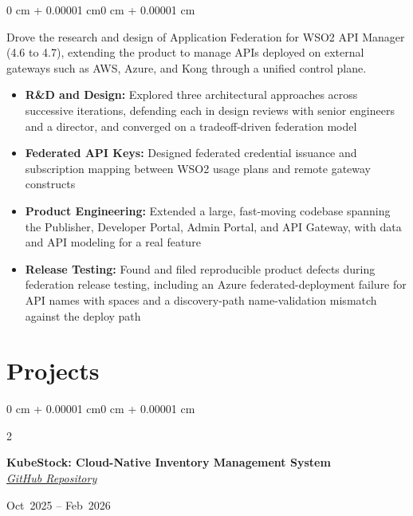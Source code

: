 \documentclass[10pt, letterpaper]{article}
\let\oldhref\href
\renewcommand{\href}[2]{\oldhref{#1}{\textit{\underline{#2}}}}
\newenvironment{highlights}{
    \begin{itemize}[
        topsep=0.10 cm,
        parsep=0.10 cm,
        partopsep=0pt,
        itemsep=0pt,
        leftmargin=0 cm + 10pt
    ]
}{
    \end{itemize}
}
\newenvironment{onecolentry}{
    \begin{adjustwidth}{0 cm + 0.00001 cm}{0 cm + 0.00001 cm}
}{
    \end{adjustwidth}
}
\newenvironment{twocolentry}[2][]{
    \onecolentry
    \def\secondColumn{#2}
    \setcolumnwidth{\fill, 4.5 cm}
    \begin{paracol}{2}
}{
    \switchcolumn \raggedleft \secondColumn
    \end{paracol}
    \endonecolentry
}
\begin{document}
    \begin{onecolentry}
        Drove the research and design of Application Federation for WSO2 API Manager (4.6 to 4.7), extending the product to manage APIs deployed on external gateways such as AWS, Azure, and Kong through a unified control plane.
        \begin{highlights}
            \item \textbf{R\&D and Design:} Explored three architectural approaches across successive iterations, defending each in design reviews with senior engineers and a director, and converged on a tradeoff-driven federation model
            \item \textbf{Federated API Keys:} Designed federated credential issuance and subscription mapping between WSO2 usage plans and remote gateway constructs
            \item \textbf{Product Engineering:} Extended a large, fast-moving codebase spanning the Publisher, Developer Portal, Admin Portal, and API Gateway, with data and API modeling for a real feature
            \item \textbf{Release Testing:} Found and filed reproducible product defects during federation release testing, including an Azure federated-deployment failure for API names with spaces and a discovery-path name-validation mismatch against the deploy path
        \end{highlights}
    \end{onecolentry}

    \section{Projects}

    \begin{twocolentry}{
        Oct~2025 -- Feb~2026
    }
        \textbf{KubeStock: Cloud-Native Inventory Management System} \\
        \href{https://github.com/KubeStock-DevOps-project}{GitHub Repository}
    \end{twocolentry}

    \vspace{0.10 cm}
\end{document}
